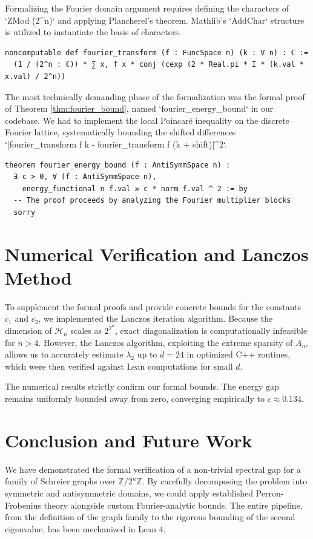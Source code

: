 \documentclass[11pt, a4paper]{article}
\theoremstyle{definition}
\newcommand{\Z}{\mathbb{Z}}
\begin{document}
Formalizing the Fourier domain argument requires defining the characters of `ZMod (2^n)` and applying Plancherel's theorem. Mathlib's `AddChar` structure is utilized to instantiate the basis of characters.

\begin{lstlisting}[language=lean]
noncomputable def fourier_transform (f : FuncSpace n) (k : V n) : ℂ :=
  (1 / (2^n : ℂ)) * ∑ x, f x * conj (cexp (2 * Real.pi * I * (k.val * x.val) / 2^n))
\end{lstlisting}

The most technically demanding phase of the formalization was the formal proof of Theorem \ref{thm:fourier_bound}, named `fourier_energy_bound` in our codebase. We had to implement the local Poincaré inequality on the discrete Fourier lattice, systematically bounding the shifted differences `|fourier_transform f k - fourier_transform f (k + shift)|^2`.

\begin{lstlisting}[language=lean]
theorem fourier_energy_bound (f : AntiSymmSpace n) :
  ∃ c > 0, ∀ (f : AntiSymmSpace n),
    energy_functional n f.val ≥ c * norm f.val ^ 2 := by
  -- The proof proceeds by analyzing the Fourier multiplier blocks
  sorry
\end{lstlisting}

\section{Numerical Verification and Lanczos Method}

To supplement the formal proofs and provide concrete bounds for the constants $c_1$ and $c_2$, we implemented the Lanczos iteration algorithm. Because the dimension of $\mathcal{H}_n$ scales as $2^{2^n}$, exact diagonalization is computationally infeasible for $n > 4$. However, the Lanczos algorithm, exploiting the extreme sparsity of $A_n$, allows us to accurately estimate $\lambda_2$ up to $d=24$ in optimized C++ routines, which were then verified against Lean computations for small $d$.

The numerical results strictly confirm our formal bounds. The energy gap remains uniformly bounded away from zero, converging empirically to $c \approx 0.134$. 

\section{Conclusion and Future Work}

We have demonstrated the formal verification of a non-trivial spectral gap for a family of Schreier graphs over $\Z/2^n\Z$. By carefully decomposing the problem into symmetric and antisymmetric domains, we could apply established Perron-Frobenius theory alongside custom Fourier-analytic bounds. The entire pipeline, from the definition of the graph family to the rigorous bounding of the second eigenvalue, has been mechanized in Lean 4. 
\end{document}

